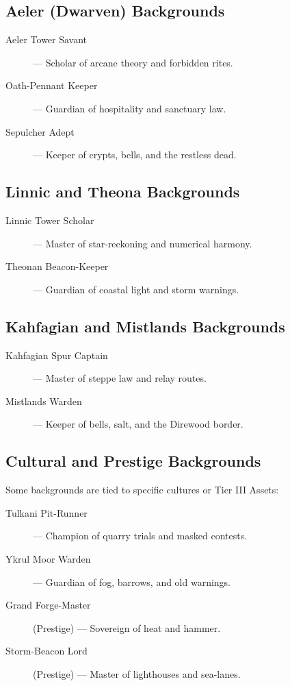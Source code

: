 \subsection*{Aeler (Dwarven) Backgrounds}

\begin{description}
  \item[Aeler Tower Savant] — Scholar of arcane theory and forbidden rites.
  \item[Oath-Pennant Keeper] — Guardian of hospitality and sanctuary law.
  \item[Sepulcher Adept] — Keeper of crypts, bells, and the restless dead.
\end{description}

\subsection*{Linnic and Theona Backgrounds}

\begin{description}
  \item[Linnic Tower Scholar] — Master of star-reckoning and numerical harmony.
  \item[Theonan Beacon-Keeper] — Guardian of coastal light and storm warnings.
\end{description}

\subsection*{Kahfagian and Mistlands Backgrounds}

\begin{description}
  \item[Kahfagian Spur Captain] — Master of steppe law and relay routes.
  \item[Mistlands Warden] — Keeper of bells, salt, and the Direwood border.
\end{description}

\subsection*{Cultural and Prestige Backgrounds}

Some backgrounds are tied to specific cultures or Tier III Assets:

\begin{description}
  \item[Tulkani Pit-Runner] — Champion of quarry trials and masked contests.
  \item[Ykrul Moor Warden] — Guardian of fog, barrows, and old warnings.
  \item[Grand Forge-Master] (Prestige) — Sovereign of heat and hammer.
  \item[Storm-Beacon Lord] (Prestige) — Master of lighthouses and sea-lanes.
\end{description}

